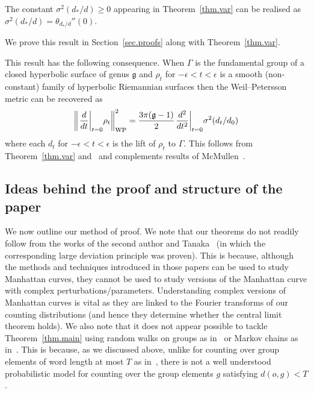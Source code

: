 \documentclass[AHL,Unicode,longabstracts,published]{cedram}
\newcommand{\G}{\Gamma}
\newcommand{\fkg}{\mathfrak{g}}
\let\originalleft\left
\let\originalright\right
\renewcommand{\left}{\mathopen{}\mathclose\bgroup\originalleft}
\renewcommand{\right}{\aftergroup\egroup\originalright}
\theoremstyle{plain}
\newcommand{\G}{\Gamma}
\begin{document}
\begin{theo}\label{thm.var2}
The constant $\sigma^2(d_\ast/d) \ge 0$ appearing in Theorem~\ref{thm.var} can be realised as $\sigma^2(d_\ast/d) = \theta_{d_\ast/d}''(0)$.
\end{theo}

We prove this result in Section~\ref{sec.proofs} along with Theorem~\ref{thm.var}.
\begin{rema}
This result has the following consequence. When $\G$ is the fundamental group of a closed hyperbolic surface of genus $\fkg$ and $\rho_t$ for $-\epsilon < t < \epsilon$ is a smooth (non-constant) family of hyperbolic Riemannian surfaces then the Weil--Petersson metric can be recovered as
\[
\left\|\left.\frac{d}{dt}\right|_{t=0} \rho_t\right\|^2_{\text{WP}} = \frac{3\pi(\fkg-1)}{2}\left.\frac{d^2}{dt^2}\right|_{t=0} \sigma^2(d_t/d_0)
\]
where each $d_t$ for $-\epsilon < t < \epsilon$ is the lift of $\rho_t$ to $\G$. This follows from Theorem~\ref{thm.var} and~\cite[Lemma~4.2]{sharp.pollicott.wp} and complements results of McMullen~\cite{mcmullen}.
\end{rema}

\subsection{Ideas behind the proof and structure of the paper}\label{sec.method}
We now outline our method of proof. We note that our theorems do not readily follow from the works of the second author and Tanaka~\cite{cantrell.tanaka.2,cantrell.tanaka.1} (in which the corresponding large deviation principle was proven). This is because, although the methods and techniques introduced in those papers can be used to study Manhattan curves, they cannot be used to study versions of the Manhattan curve with complex perturbations/parameters. Understanding complex versions of Manhattan curves is vital as they are linked to the Fourier transforms of our counting distributions (and hence they determine whether the central limit theorem holds). We also note that it does not appear possible to tackle Theorem~\ref{thm.main} using random walks on groups as in~\cite{GTT} or Markov chains as in~\cite{cantrell.sert}. This is because, as we discussed above, unlike for counting over group elements of word length at most $T$ as in~\cite{cantrell.sert,GTT}, there is not a well understood probabilistic model for counting over the group elements $g$ satisfying $d(o,g) < T$.
\end{document}
